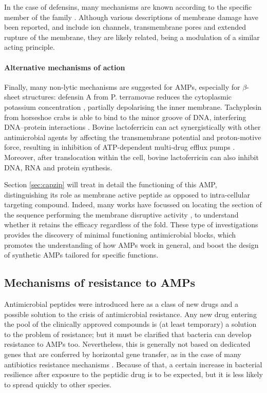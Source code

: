 In the case of defensins, many mechanisms are known according to the specific member of the family \citep{Lehrer2004,Kagan1990,Takeuchi2004}.
%
Although various descriptions of membrane damage have been reported, and include ion channels, transmembrane pores and extended rupture of the membrane, they are likely related, being a modulation of a similar acting principle.


\paragraph{Alternative mechanisms of action} Finally, many non-lytic mechanisms are suggested for AMPs, especially for $\beta$-sheet structures: defensin A from P. terramovae reduces the cytoplasmic potassium concentration \citep{Brogden2005}, partially depolarising the inner membrane. Tachyplesin from horseshoe crabs is able to bind to the minor groove of DNA, interfering DNA–protein interactions \citep{Yonezawa1992}.
%
Bovine lactoferricin can act synergistically with other antimicrobial agents by affecting the transmembrane potential and proton-motive force, resulting in inhibition of ATP-dependent multi-drug efflux pumps \citep{Gifford2005}.
%
Moreover, after translocation within the cell, bovine lactoferricin can also inhibit DNA, RNA and protein synthesis.

Section \ref{sec:capzip} will treat in detail the functioning of this AMP, distinguishing its role as membrane active peptide as opposed to intra-cellular targeting compound. Indeed, many works have focussed on locating the section of the sequence performing the membrane disruptive activity \citep{Tomita1994,Schibli1999}, to understand whether it retains the efficacy regardless of the fold.
%
These type of investigations provides the discovery of minimal functioning antimicrobial blocks, which promotes the understanding of how AMPs work in general, and boost the design of synthetic AMPs tailored for specific functions.


\subsection{Mechanisms of resistance to AMPs}

Antimicrobial peptides were introduced here as a class of new drugs and a possible solution to the crisis of antimicrobial resistance. Any new drug entering the pool of the clinically approved compounds is (at least temporary) a solution to the problem of resistance; but it must be clarified that bacteria can develop resistance to AMPs too.
%
Nevertheless, this is generally not based on dedicated genes that are conferred by horizontal gene transfer, as in the case of many antibiotics resistance mechanisms \citep{Peschel2006}. Because of that, a certain increase in bacterial resilience after exposure to the peptidic drug is to be expected, but it is less likely to spread quickly to other species.

